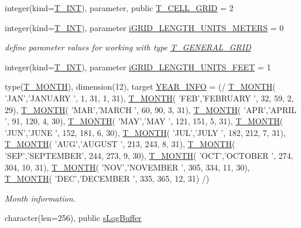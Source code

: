 \begin{DoxyCompactItemize}
integer(kind=\hyperlink{namespacetypes_a4e4d040a4425196c4d43be63e7e6103a}{T\_\-INT}), parameter, public \hyperlink{namespacetypes_a540676e3b79330fe7fa26455d749cb35}{T\_\-CELL\_\-GRID} = 2
\item 
integer(kind=\hyperlink{namespacetypes_a4e4d040a4425196c4d43be63e7e6103a}{T\_\-INT}), parameter \hyperlink{namespacetypes_addaf796ce1bbf5d055d4b236092e0aaf}{iGRID\_\-LENGTH\_\-UNITS\_\-METERS} = 0
\begin{DoxyCompactList}\small\item\em define parameter values for working with type \hyperlink{typetypes_1_1_t___g_e_n_e_r_a_l___g_r_i_d}{T\_\-GENERAL\_\-GRID} \item\end{DoxyCompactList}\item 
integer(kind=\hyperlink{namespacetypes_a4e4d040a4425196c4d43be63e7e6103a}{T\_\-INT}), parameter \hyperlink{namespacetypes_a09fb47af7ad4b30ae025dd1241f3081f}{iGRID\_\-LENGTH\_\-UNITS\_\-FEET} = 1
\item 
type(\hyperlink{typetypes_1_1_t___m_o_n_t_h}{T\_\-MONTH}), dimension(12), target \hyperlink{namespacetypes_af6a870221fe362a59d31b23393e431b1}{YEAR\_\-INFO} = (/ \hyperlink{typetypes_1_1_t___m_o_n_t_h}{T\_\-MONTH}( 'JAN','JANUARY ', 1, 31, 1, 31), \hyperlink{typetypes_1_1_t___m_o_n_t_h}{T\_\-MONTH}( 'FEB','FEBRUARY ', 32, 59, 2, 29), \hyperlink{typetypes_1_1_t___m_o_n_t_h}{T\_\-MONTH}( 'MAR','MARCH ', 60, 90, 3, 31), \hyperlink{typetypes_1_1_t___m_o_n_t_h}{T\_\-MONTH}( 'APR','APRIL ', 91, 120, 4, 30), \hyperlink{typetypes_1_1_t___m_o_n_t_h}{T\_\-MONTH}( 'MAY','MAY ', 121, 151, 5, 31), \hyperlink{typetypes_1_1_t___m_o_n_t_h}{T\_\-MONTH}( 'JUN','JUNE ', 152, 181, 6, 30), \hyperlink{typetypes_1_1_t___m_o_n_t_h}{T\_\-MONTH}( 'JUL','JULY ', 182, 212, 7, 31), \hyperlink{typetypes_1_1_t___m_o_n_t_h}{T\_\-MONTH}( 'AUG','AUGUST ', 213, 243, 8, 31), \hyperlink{typetypes_1_1_t___m_o_n_t_h}{T\_\-MONTH}( 'SEP','SEPTEMBER', 244, 273, 9, 30), \hyperlink{typetypes_1_1_t___m_o_n_t_h}{T\_\-MONTH}( 'OCT','OCTOBER ', 274, 304, 10, 31), \hyperlink{typetypes_1_1_t___m_o_n_t_h}{T\_\-MONTH}( 'NOV','NOVEMBER ', 305, 334, 11, 30), \hyperlink{typetypes_1_1_t___m_o_n_t_h}{T\_\-MONTH}( 'DEC','DECEMBER ', 335, 365, 12, 31) /)
\begin{DoxyCompactList}\small\item\em Month information. \item\end{DoxyCompactList}\item 
character(len=256), public \hyperlink{namespacetypes_a67706eade7740303d70d3377080a9eb3}{sLogBuffer}

\end{DoxyCompactItemize}
